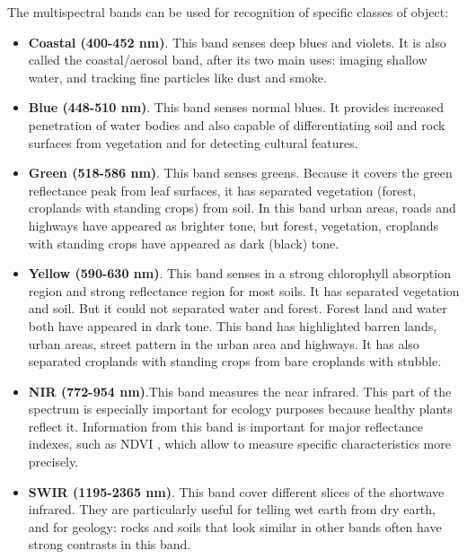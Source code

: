 \documentclass[10pt,twocolumn,letterpaper]{article}
\begin{document}
The multispectral bands can be used for recognition of specific classes of object:

\begin{itemize}
	\item \textbf{Coastal (400-452 nm)}. This band senses deep blues and violets.
	 It is also called the coastal/aerosol band, after its two main uses: imaging shallow water, and tracking fine particles like dust and smoke. 
	
	\item \textbf{Blue (448-510 nm)}. This band senses normal blues. It provides increased penetration of water bodies and also capable of differentiating soil and rock surfaces from vegetation and for detecting cultural features. 
	
	\item \textbf{Green (518-586 nm)}. This band senses greens. Because it covers the green reflectance peak from leaf surfaces, it has separated vegetation (forest, croplands with standing crops) from soil. In this band urban areas, roads and highways have appeared as brighter tone, but forest, vegetation, croplands with standing crops have appeared as dark (black) tone. 
		
	\item \textbf{Yellow (590-630 nm)}. This band senses in a strong chlorophyll absorption region and strong reflectance region for most soils. It has separated vegetation and soil. But it could not separated water and forest. Forest land and water both have appeared in dark tone. This band has highlighted barren lands, urban areas, street pattern in the urban area and highways. It has also separated croplands with standing crops from bare croplands with stubble. 
	
	\item \textbf{NIR (772-954 nm)}.This band measures the near infrared. This part of the spectrum is especially important for ecology purposes because healthy plants reflect it. Information from this band is important for major reflectance indexes, such as NDVI \cite{ndvi}, which allow to measure specific characteristics more precisely. 
		 
	\item \textbf{SWIR (1195-2365 nm)}. This band cover different slices of the shortwave infrared. They are particularly useful for telling wet earth from dry earth, and for geology: rocks and soils that look similar in other bands often have strong contrasts in this band. 	
\end{itemize}
\end{document}
